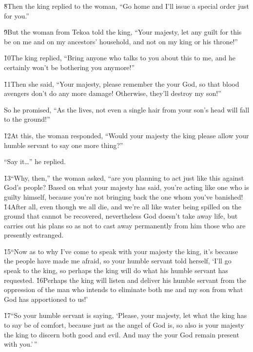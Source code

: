 \v{8}Then the king replied to the woman, ``Go home and I'll issue a special order just for you.''

\v{9}But the woman from Tekoa told the king, ``Your majesty, let any guilt for this be on me and on my ancestors' household, and not on my king or his throne!''

\v{10}The king replied, ``Bring anyone who talks to you about this to me, and he certainly won't be bothering you anymore!''

\v{11}Then she said, ``Your majesty, please remember the  your God, so that blood avengers don't do any more damage! Otherwise, they'll destroy my son!''

So he promised, ``As the  lives, not even a single hair from your son's head will fall to the ground!''

\v{12}At this, the woman responded, ``Would your majesty the king please allow your humble servant to say one more thing?''

``Say it{\ldots}'' he replied.

\v{13}``Why, then,'' the woman asked, ``are you planning to act just like this against God's people? Based on what your majesty has said, you're acting like one who is guilty himself, because you're not bringing back the one whom you've banished! \v{14}After all, even though we all die, and we're all like water being spilled on the ground that cannot be recovered, nevertheless God doesn't take away life, but carries out his plans so as not to cast away permanently from him those who are presently estranged.

\v{15}``Now as to why I've come to speak with your majesty the king, it's because the people have made me afraid, so your humble servant told herself, `I'll go speak to the king, so perhaps the king will do what his humble servant has requested. \v{16}Perhaps the king will listen and deliver his humble servant from the oppression of the man who intends to eliminate both me and my son from what God has apportioned to us!'

\v{17}``So your humble servant is saying, `Please, your majesty, let what the king has to say be of comfort, because just as the angel of God is, so also is your majesty the king to discern both good and evil. And may the  your God remain present with you.'\,''

